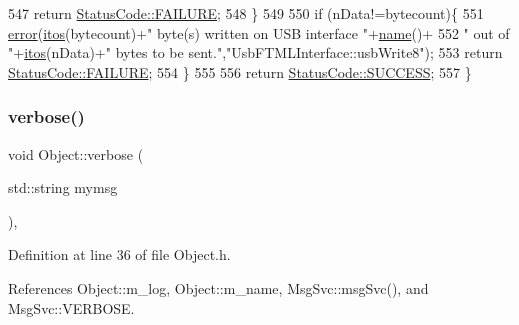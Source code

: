\begin{DoxyCode}
547     \textcolor{keywordflow}{return} \hyperlink{classStatusCode_a6f565cbeadc76d14c72f047e5e85eb4ba3da73d4c469762eb9d3c960368252b26}{StatusCode::FAILURE};
548   \}
549 
550   \textcolor{keywordflow}{if} (nData!=bytecount)\{
551     \hyperlink{classObject_a204a95f57818c0f811933917a30eff45}{error}(\hyperlink{Tools_8h_af330027dbdafb9a30768b3613c553e60}{itos}(bytecount)+\textcolor{stringliteral}{" byte(s) written on USB interface "}+\hyperlink{classObject_a300f4c05dd468c7bb8b3c968868443c1}{name}()+
552             \textcolor{stringliteral}{" out of "}+\hyperlink{Tools_8h_af330027dbdafb9a30768b3613c553e60}{itos}(nData)+\textcolor{stringliteral}{" bytes to be sent."},\textcolor{stringliteral}{"UsbFTMLInterface::usbWrite8"});
553     \textcolor{keywordflow}{return} \hyperlink{classStatusCode_a6f565cbeadc76d14c72f047e5e85eb4ba3da73d4c469762eb9d3c960368252b26}{StatusCode::FAILURE};    
554   \}
555 
556   \textcolor{keywordflow}{return} \hyperlink{classStatusCode_a6f565cbeadc76d14c72f047e5e85eb4badd0da38d3ba0d922efd1f4619bc37ad8}{StatusCode::SUCCESS};  
557 \}
\end{DoxyCode}
\mbox{\label{classObject_a83d2db2df682907ea1115ad721c1c4a1}} 
\subsubsection{\texorpdfstring{verbose()}{verbose()}\hspace{0.1cm}{\footnotesize\ttfamily [1/2]}}
{\footnotesize\ttfamily void Object\+::verbose (\begin{DoxyParamCaption}\item[{std\+::string}]{mymsg }\end{DoxyParamCaption})\hspace{0.3cm}{\ttfamily [inline]}, {\ttfamily [inherited]}}



Definition at line 36 of file Object.\+h.



References Object\+::m\+\_\+log, Object\+::m\+\_\+name, Msg\+Svc\+::msg\+Svc(), and Msg\+Svc\+::\+V\+E\+R\+B\+O\+SE.



